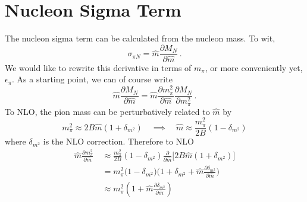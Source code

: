 \documentclass[12pt,tightenlines, raggedbottom, prd, notitlepage]{revtex4-1}
\begin{document}
\section{Nucleon Sigma Term}
The nucleon sigma term can be calculated from the nucleon mass. To wit, 
\begin{equation}
\sigma_{\pi N} = \hat m \frac{\partial M_N}{\partial \hat m} \, .
\end{equation}
We would like to rewrite this derivative in terms of $m_\pi$, or more conveniently yet, $\epsilon_\pi$. As a starting point, we can of course write 
\begin{equation}
\hat m \frac{\partial M_N}{\partial \hat m} = \hat m \frac{\partial m_\pi^2}{\partial \hat m}\frac{\partial M_N}{\partial m_\pi^2} \, .
\end{equation}
To NLO, the pion mass can be perturbatively related to $\hat m$ by
\begin{equation}
m_\pi^2 \approx 2 B \hat m \left( 1 + \delta_{m^2} \right) 
\quad \implies \quad
\hat m  \approx \frac{m_\pi^2}{2 B}  \left( 1 - \delta_{m^2} \right)
\end{equation}
where $\delta_{m^2}$ is the NLO correction. Therefore to NLO
\begin{align}
\hat m \frac{\partial m_\pi^2}{\partial \hat m}\ &\approx \frac{m_\pi^2}{2 B}  \left( 1 - \delta_{m^2} \right) \frac{\partial}{\partial \hat m} \Big[ 2 B \hat m \left( 1 + \delta_{m^2} \right) \Big] \nonumber \\
&= m_\pi^2 \Big( 1 - \delta_{m^2} \Big) \Big( 1 + \delta_{m^2} + \hat m \frac{\partial \delta_{m^2}}{\partial \hat m} \Big) \nonumber \\
&\approx m_\pi^2 \left( 1 + \hat m \frac{\partial \delta_{m^2}}{\partial \hat m} \right)
\end{align}
\end{document}
